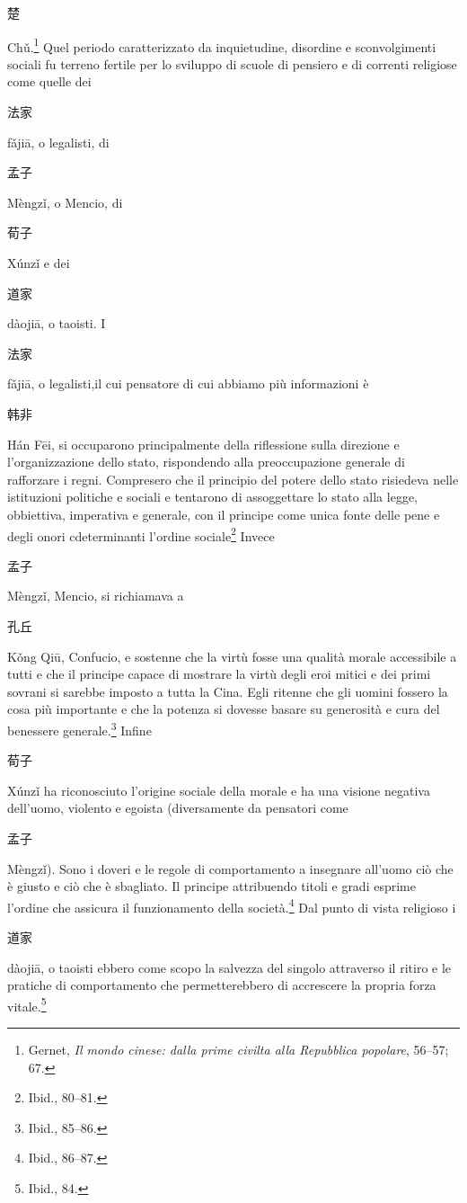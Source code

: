 \documentclass[12pt,titlepage]{article}
\begin{document}
\begin{CJK*}{UTF8}{gbsn}楚 \end{CJK*}Chǔ.\footnote{Gernet, \emph{Il mondo cinese: dalla prime civilta alla Repubblica popolare}, 56–57; 67.}
Quel periodo caratterizzato da inquietudine, disordine e sconvolgimenti sociali fu terreno fertile per lo sviluppo di scuole di pensiero e di correnti religiose come quelle dei 
\begin{CJK*}{UTF8}{gbsn} 法家\end{CJK*} fǎjiā, o legalisti, di 
\begin{CJK*}{UTF8}{gbsn}孟子\end{CJK*} Mèngzǐ, o Mencio, di
\begin{CJK*}{UTF8}{gbsn} 荀子 \end{CJK*}Xúnzǐ e dei\begin{CJK*}{UTF8}{gbsn}道家 \end{CJK*}dàojiā, o taoisti.
I
\begin{CJK*}{UTF8}{gbsn}法家 \end{CJK*}fǎjiā, o legalisti,il cui pensatore di cui abbiamo più informazioni è \begin{CJK*}{UTF8}{gbsn}韩非 \end{CJK*}Hán Fēi, si occuparono principalmente della riflessione sulla direzione e l'organizzazione dello stato, rispondendo alla preoccupazione generale di rafforzare i regni. Compresero che il principio del potere dello stato risiedeva nelle istituzioni politiche e sociali e tentarono di assoggettare lo stato alla legge, obbiettiva, imperativa e generale, con il principe come unica fonte delle pene e degli onori cdeterminanti l'ordine sociale\footnote{Ibid., 80–81.}
Invece 
\begin{CJK*}{UTF8}{gbsn}孟子 \end{CJK*}Mèngzǐ, Mencio, si richiamava a 
\begin{CJK*}{UTF8}{gbsn}孔丘 \end{CJK*}Kǒng Qiū, Confucio, e sostenne che la virtù fosse una qualità morale accessibile a tutti e che il principe capace di mostrare la virtù degli eroi mitici e dei primi sovrani si sarebbe imposto a tutta la Cina. Egli ritenne che gli uomini fossero la cosa più importante e che la potenza si dovesse basare su generosità e cura del benessere generale.\footnote{Ibid., 85–86.}
Infine \begin{CJK*}{UTF8}{gbsn}荀子 \end{CJK*}Xúnzǐ ha riconosciuto l'origine sociale della morale e ha una visione negativa dell'uomo, violento e egoista (diversamente da pensatori come 
\begin{CJK*}{UTF8}{gbsn}孟子 \end{CJK*}Mèngzǐ). Sono i doveri e le regole di comportamento a insegnare all'uomo ciò che è giusto e ciò che è sbagliato. Il principe attribuendo titoli e gradi esprime l'ordine che assicura il funzionamento della società.\footnote{Ibid., 86–87.}
Dal punto di vista religioso i 
\begin{CJK*}{UTF8}{gbsn}道家\end{CJK*} dàojiā, o taoisti ebbero come scopo la salvezza del singolo attraverso il ritiro e le pratiche di comportamento che permetterebbero di accrescere la propria forza vitale.\footnote{Ibid., 84.}
\end{document}
